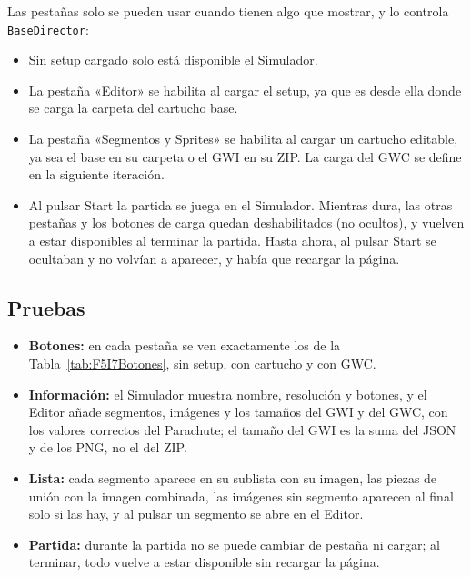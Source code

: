 Las pestañas solo se pueden usar cuando tienen algo que mostrar, y lo
controla \texttt{BaseDirector}:

\begin{itemize}
	\item Sin setup cargado solo está disponible el Simulador.
	
	\item La pestaña «Editor» se habilita al cargar el setup, ya que es
	desde ella donde se carga la carpeta del cartucho base.

	\item La pestaña «Segmentos y Sprites» se habilita al cargar un
	cartucho editable, ya sea el base en su carpeta o el GWI en su ZIP.
	La carga del GWC se define en la siguiente iteración.
	
	\item Al pulsar Start la partida se juega en el Simulador. Mientras
	dura, las otras pestañas y los botones de carga quedan
	deshabilitados (no ocultos), y vuelven a estar disponibles al
	terminar la partida. Hasta ahora, al pulsar Start se ocultaban y no volvían a
	aparecer, y había que recargar la página.
\end{itemize}


\subsection{Pruebas}
\label{sec:F5I7Pruebas}

\begin{itemize}
	\item \textbf{Botones:} en cada pestaña se ven exactamente los de la
	Tabla~\ref{tab:F5I7Botones}, sin setup, con cartucho y con GWC.
	
	\item \textbf{Información:} el Simulador muestra nombre, resolución
	y botones, y el Editor añade segmentos, imágenes y los tamaños del
	GWI y del GWC, con los valores correctos del Parachute; el tamaño
	del GWI es la suma del JSON y de los PNG, no el del ZIP.

	\item \textbf{Lista:} cada segmento aparece en su sublista con su
	imagen, las piezas de unión con la imagen combinada, las imágenes
	sin segmento aparecen al final solo si las hay, y al pulsar un
	segmento se abre en el Editor.
	
	\item \textbf{Partida:} durante la partida no se puede cambiar de
	pestaña ni cargar; al terminar, todo vuelve a estar disponible sin
	recargar la página.
\end{itemize}

